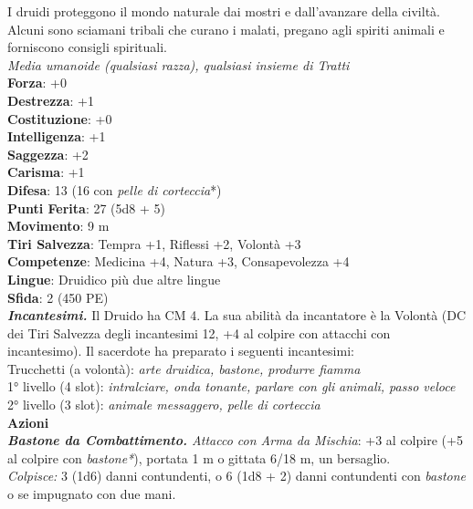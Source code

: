 \begin{multicols}{2}
I druidi proteggono il mondo naturale dai mostri e dall'avanzare della civiltà. Alcuni sono sciamani tribali che curano i malati, pregano agli spiriti animali e forniscono consigli spirituali.\\
\emph{Media umanoide (qualsiasi razza), qualsiasi insieme di Tratti}\\
\textbf{Forza}: +0\\
\textbf{Destrezza}: +1\\
\textbf{Costituzione}: +0\\
\textbf{Intelligenza}: +1\\
\textbf{Saggezza}: +2\\
\textbf{Carisma}: +1\\
\textbf{Difesa}: 13 (16 con \emph{pelle di corteccia}*)\\
\textbf{Punti Ferita}: 27 (5d8 + 5)\\
\textbf{Movimento}: 9 m\\
\textbf{Tiri Salvezza}: Tempra +1, Riflessi +2, Volontà +3 \\
\textbf{Competenze}: Medicina +4, Natura +3, Consapevolezza +4\\
\textbf{Lingue}: Druidico più due altre lingue\\
\textbf{Sfida}: 2 (450 PE)\smallskip\\
\emph{\textbf{Incantesimi.}} Il Druido ha CM 4. La sua abilità da incantatore è la Volontà (DC dei Tiri Salvezza degli incantesimi 12, +4 al colpire con attacchi con incantesimo). Il sacerdote ha preparato i seguenti incantesimi:\\
Trucchetti (a volontà): \emph{arte druidica, bastone, produrre fiamma}\\
1° livello (4 slot): \emph{intralciare, onda tonante, parlare con gli} \emph{animali, passo veloce}\\
2° livello (3 slot): \emph{animale messaggero, pelle di corteccia}\\
\smallskip\textbf{Azioni}\\
\emph{\textbf{Bastone da Combattimento.} Attacco con Arma da Mischia}: +3 al colpire (+5 al colpire con \emph{bastone*}), portata 1 m o gittata 6/18 m, un bersaglio. \\
\emph{Colpisce:} 3 (1d6) danni contundenti, o 6 (1d8 + 2) danni contundenti con \emph{bastone} o se impugnato con due mani.\\


\end{multicols}

